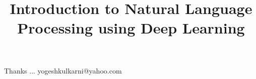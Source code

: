 \documentclass[xcolor=dvipsnames,compress,t,pdf,9pt]{beamer}
\title[\insertframenumber /\inserttotalframenumber]{Introduction to Natural Language Processing using Deep Learning}
\begin{document}
	\begin{frame}
	\titlepage
%
	\end{frame}
	
%	
	
	
	\begin{frame}[c]{}
	Thanks ...
	\vspace{5mm}
	yogeshkulkarni@yahoo.com
	\end{frame}
\end{document}
